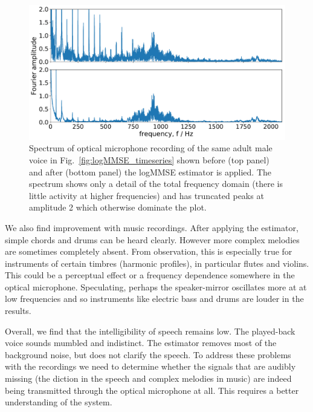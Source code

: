 \documentclass[paper-main.tex]{subfiles}
\begin{document}
\begin{figure}
	\includegraphics[width=\textwidth]{figures/filter_spectrum_aa_melatos-cropped.pdf}
	\caption{Spectrum of optical microphone recording of the same adult male voice in Fig.~\ref{fig:logMMSE_timeseries} shown before (top panel) and after (bottom panel) the logMMSE estimator is applied. The spectrum shows only a detail of the total frequency domain (there is little activity at higher frequencies) and has truncated peaks at amplitude 2 which otherwise dominate the plot.}
	\label{fig:logMMSE_spectrum}
\end{figure}


We also find improvement with music recordings.
After applying the estimator, simple chords and drums can be heard clearly. 
However more complex melodies are sometimes completely absent. 
From observation, this is especially true for instruments of certain timbres (harmonic profiles), in particular flutes and violins.
This could be a perceptual effect or a frequency dependence somewhere in the optical microphone. 
Speculating, perhaps the speaker-mirror oscillates more at at low frequencies and so instruments like electric bass and drums are louder in the results.


Overall, we find that the intelligibility of speech remains low. 
The played-back voice sounds mumbled and indistinct. 
The estimator removes most of the background noise, but does not clarify the speech. 
To address these problems with the recordings we need to determine whether the signals that are audibly missing (the diction in the speech and complex melodies in music) are indeed being transmitted through the optical microphone at all. 
This requires a better understanding of the system.
\end{document}
